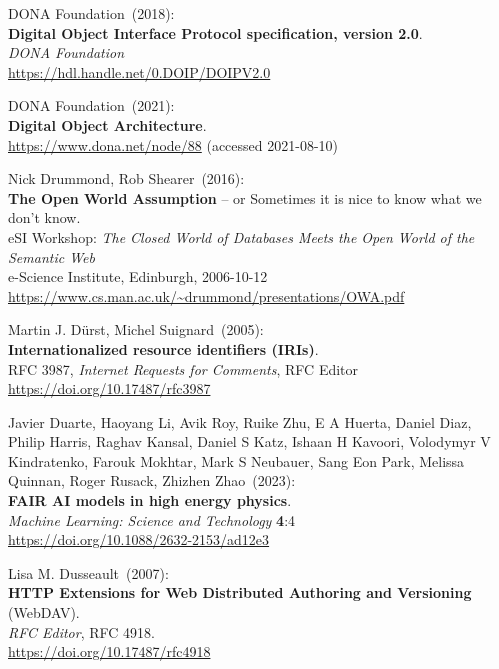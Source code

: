 \begin{thebibliography}{9}
DONA Foundation~(2018): \\
\textbf{Digital Object Interface Protocol specification, version 2.0}.\\
\emph{DONA Foundation}\\
\url{https://hdl.handle.net/0.DOIP/DOIPV2.0}

DONA Foundation~(2021): \\
\textbf{Digital Object Architecture}.\\
\url{https://www.dona.net/node/88} (accessed 2021-08-10)

Nick Drummond, Rob Shearer~(2016): \\
\textbf{The Open World Assumption} -- or Sometimes it is nice to know what we don't know.\\
eSI Workshop: \emph{The Closed World of Databases Meets the Open World of the Semantic Web}\\
e-Science Institute, Edinburgh, 2006-10-12\\
\url{https://www.cs.man.ac.uk/~drummond/presentations/OWA.pdf}

Martin J. Dürst, Michel Suignard~(2005): \\
\textbf{Internationalized resource identifiers (IRIs)}.\\
RFC 3987, \emph{Internet Requests for Comments}, RFC Editor\\
\url{https://doi.org/10.17487/rfc3987}

Javier Duarte, Haoyang Li, Avik Roy, Ruike Zhu, E A Huerta, Daniel Diaz, Philip Harris, Raghav Kansal, Daniel S Katz, Ishaan H Kavoori, Volodymyr V Kindratenko, Farouk Mokhtar, Mark S Neubauer, Sang Eon Park, Melissa Quinnan, Roger Rusack, Zhizhen Zhao~(2023): \\
\textbf{FAIR AI models in high energy physics}.\\
\emph{Machine Learning: Science and Technology} \textbf{4}:4 \\
\url{https://doi.org/10.1088/2632-2153/ad12e3}

Lisa M. Dusseault~(2007): \\
\textbf{HTTP Extensions for Web Distributed Authoring and Versioning} (WebDAV). \\
\emph{RFC Editor}, RFC 4918.\\
\url{https://doi.org/10.17487/rfc4918}


\end{thebibliography}
